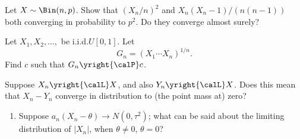 \begin{problem}[DasGupta 7.17]
  Let \(X\sim\Bin(n,p)\). Show that \((X_n/n)^2\) and
  \(X_n(X_n-1)/(n(n-1))\) both converging in probability to \(p^2\). Do
  they converge almost surely?
\end{problem}
\begin{solution}

\end{solution}
\newpage

\begin{problem}[DasGupta 7.21]
  Let \(X_1,X_2,\dotsc,\) be i.i.d.\@ \(U[0,1]\). Let
  \[
    G_n=(X_1\dotsm X_n)^{1/n}.
  \]
  Find \(c\) such that \(G_n\yright{\calP} c\).
\end{problem}
\begin{solution}

\end{solution}
\newpage

\begin{problem}
  Suppose \(X_n\yright{\calL}X\), and also \(Y_n\yright{\calL} X\). Does
  this mean that \(X_n-Y_n\) converge in distribution to (the point mass
  at) zero?
\end{problem}
\begin{solution}

\end{solution}
\newpage

\begin{problem}[DasGupta 7.31 (a)]
  \begin{enumerate}[label=(\alph*),noitemsep]
  \item Suppose \(a_n(X_n-\theta)\to N(0,\tau^2)\); what can be said
    about the limiting distribution of \(|X_n|\), when \(\theta\neq 0\),
    \(\theta=0\)?
  \end{enumerate}
\end{problem}
\begin{solution}

\end{solution}

